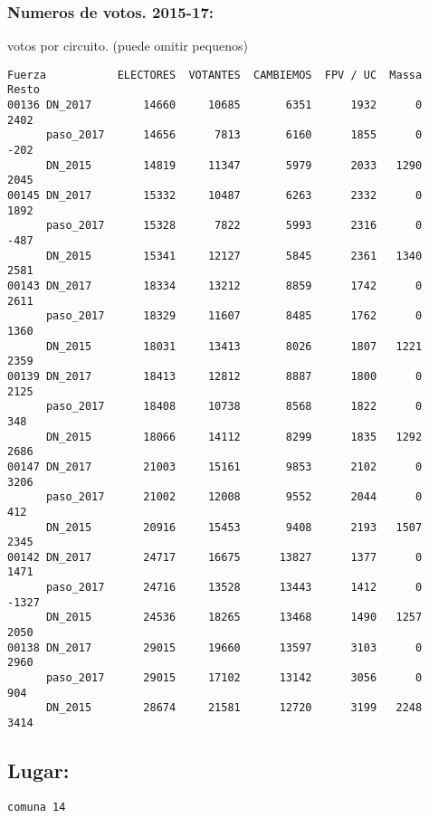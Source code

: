 \documentclass[11pt]{article}
\begin{document}
    \hypertarget{numeros-de-votos.-2015-17}{%
\subsubsection{Numeros de votos.
2015-17:}\label{numeros-de-votos.-2015-17}}

    
    votos por circuito. (puede omitir pequenos)

    
    
    \begin{verbatim}
Fuerza           ELECTORES  VOTANTES  CAMBIEMOS  FPV / UC  Massa  Resto
00136 DN_2017        14660     10685       6351      1932      0   2402
      paso_2017      14656      7813       6160      1855      0   -202
      DN_2015        14819     11347       5979      2033   1290   2045
00145 DN_2017        15332     10487       6263      2332      0   1892
      paso_2017      15328      7822       5993      2316      0   -487
      DN_2015        15341     12127       5845      2361   1340   2581
00143 DN_2017        18334     13212       8859      1742      0   2611
      paso_2017      18329     11607       8485      1762      0   1360
      DN_2015        18031     13413       8026      1807   1221   2359
00139 DN_2017        18413     12812       8887      1800      0   2125
      paso_2017      18408     10738       8568      1822      0    348
      DN_2015        18066     14112       8299      1835   1292   2686
00147 DN_2017        21003     15161       9853      2102      0   3206
      paso_2017      21002     12008       9552      2044      0    412
      DN_2015        20916     15453       9408      2193   1507   2345
00142 DN_2017        24717     16675      13827      1377      0   1471
      paso_2017      24716     13528      13443      1412      0  -1327
      DN_2015        24536     18265      13468      1490   1257   2050
00138 DN_2017        29015     19660      13597      3103      0   2960
      paso_2017      29015     17102      13142      3056      0    904
      DN_2015        28674     21581      12720      3199   2248   3414
    \end{verbatim}

    
    \hypertarget{lugar}{%
\subsection{Lugar:}\label{lugar}}

    
    \begin{Verbatim}[commandchars=\\\{\}]
comuna 14

    \end{Verbatim}
\end{document}
